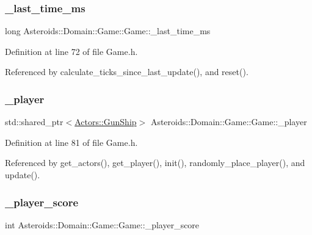 \subsubsection{\texorpdfstring{\+\_\+last\+\_\+time\+\_\+ms}{\_last\_time\_ms}}
{\footnotesize\ttfamily long Asteroids\+::\+Domain\+::\+Game\+::\+Game\+::\+\_\+last\+\_\+time\+\_\+ms\hspace{0.3cm}{\ttfamily [private]}}



Definition at line 72 of file Game.\+h.



Referenced by calculate\+\_\+ticks\+\_\+since\+\_\+last\+\_\+update(), and reset().

\mbox{\label{classAsteroids_1_1Domain_1_1Game_1_1Game_a98ff3e6110403a4133ebbae40d4eb605}} 
\subsubsection{\texorpdfstring{\+\_\+player}{\_player}}
{\footnotesize\ttfamily std\+::shared\+\_\+ptr$<$\hyperlink{classAsteroids_1_1Domain_1_1Game_1_1Actors_1_1GunShip}{Actors\+::\+Gun\+Ship}$>$ Asteroids\+::\+Domain\+::\+Game\+::\+Game\+::\+\_\+player\hspace{0.3cm}{\ttfamily [private]}}



Definition at line 81 of file Game.\+h.



Referenced by get\+\_\+actors(), get\+\_\+player(), init(), randomly\+\_\+place\+\_\+player(), and update().

\mbox{\label{classAsteroids_1_1Domain_1_1Game_1_1Game_ac21c7069836851c7485c39d1864df670}} 
\subsubsection{\texorpdfstring{\+\_\+player\+\_\+score}{\_player\_score}}
{\footnotesize\ttfamily int Asteroids\+::\+Domain\+::\+Game\+::\+Game\+::\+\_\+player\+\_\+score\hspace{0.3cm}{\ttfamily [private]}}



